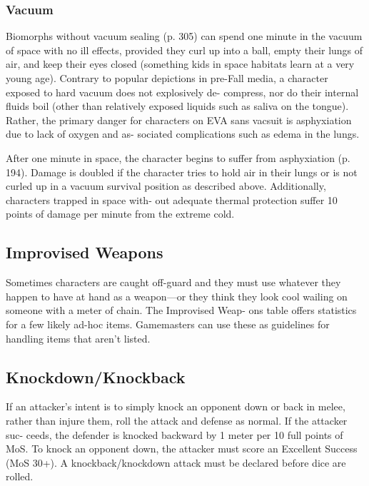 \subsubsection{Vacuum}


Biomorphs without vacuum sealing (p. 305) can 
spend one minute in the vacuum of space with no ill 
effects, provided they curl up into a ball, empty their 
lungs of air, and keep their eyes closed (something kids 
in space habitats learn at a very young age). Contrary 
to popular depictions in pre-Fall media, a character 
exposed to hard vacuum does not explosively de-
compress, nor do their internal fluids boil (other than 
relatively exposed liquids such as saliva on the tongue). 
Rather, the primary danger for characters on EVA sans 
vacsuit is asphyxiation due to lack of oxygen and as-
sociated complications such as edema in the lungs.

After one minute in space, the character begins to 
suffer from asphyxiation (p. 194). Damage is doubled 
if the character tries to hold air in their lungs or is not 
curled up in a vacuum survival position as described 
above. Additionally, characters trapped in space with-
out adequate thermal protection suffer 10 points of 
damage per minute from the extreme cold.

\subsection{Improvised Weapons}

Sometimes characters are caught off-guard and they 
must use whatever they happen to have at hand as 
a weapon—or they think they look cool wailing on 
someone with a meter of chain. The Improvised Weap-
ons table offers statistics for a few likely ad-hoc items. 
Gamemasters can use these as guidelines for handling 
items that aren't listed.

\subsection{Knockdown/Knockback}

If an attacker's intent is to simply knock an opponent 
down or back in melee, rather than injure them, roll 
the attack and defense as normal. If the attacker suc-
ceeds, the defender is knocked backward by 1 meter 
per 10 full points of MoS. To knock an opponent 
down, the attacker must score an Excellent Success 
(MoS 30+). A knockback/knockdown attack must be 
declared before dice are rolled.

